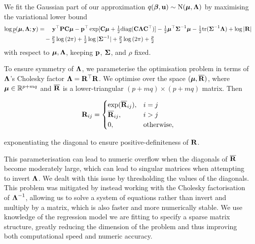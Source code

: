 \documentclass{amsart}[12pt]
\begin{document}
	We fit the Gaussian part of our approximation $q({\boldsymbol \beta}, {\bf u}) \sim \text{N}({\boldsymbol \mu}, {\boldsymbol \Lambda})$ by maximising 
	the variational lower bound	
	\begin{align*}
		\log \underline{p}({\boldsymbol \mu}, {\boldsymbol \Lambda}; {\bf y}) & = \quad {\bf y}^\top{\bf P} {\bf C} {\boldsymbol\mu} - {\bf p}^\top \exp[{\bf C} {\boldsymbol \mu} + \tfrac{1}{2} \text{diag}({\bf C} {\boldsymbol \Lambda} {\bf C}^\top)] - \tfrac{1}{2} {\boldsymbol \mu}^\top {\boldsymbol\Sigma}^{-1} {\boldsymbol \mu} - \tfrac{1}{2} \text{tr}{({\boldsymbol\Sigma}^{-1} {\boldsymbol\Lambda})} + \log{|{\bf R}|} \\
		                                        & \quad - \tfrac{p}{2} \log{(2 \pi)} + \tfrac{1}{2} \log{|{\boldsymbol\Sigma}^{-1}|} + \tfrac{p}{2} \log{(2 \pi)} + \tfrac{p}{2}                                                                              
	\end{align*}
	\noindent with respect to ${\boldsymbol \mu}, {\boldsymbol \Lambda}$, keeping ${\bf p}$, ${\boldsymbol \Sigma}$, and $\rho$ fixed.
		
	To ensure symmetry of ${\boldsymbol \Lambda}$, we parameterise the optimisation problem in terms of ${\boldsymbol \Lambda}$'s
	Cholesky factor  ${\boldsymbol \Lambda} = {\bf R}^\top {\bf R}$. We optimise over the space $({\boldsymbol \mu}, \overline{{\bf R}})$, where ${\boldsymbol \mu}
	\in {\mathbb{R}}^{p + mq}$ and $\overline{{\bf R}}$ is a lower-triangular $(p + mq) \times (p + mq)$ matrix. Then
		
	\begin{equation*}
		{\bf R}_{ij} =
		\begin{cases}
			\exp(\overline{{\bf R}}_{ij}), & i = j             \\
			\overline{{\bf R}}_{ij},       & i > j             \\
			0,                         & \text{otherwise}, 
		\end{cases}
	\end{equation*}
		
	\noindent exponentiating the diagonal to ensure positive-definiteness of ${\bf R}$.
		
	This parameterisation can lead to numeric overflow when the diagonals of $\overline{{\bf R}}$ become moderately
	large, which can lead to singular matrices when attempting to invert ${\boldsymbol \Lambda}$. We dealt with this issue by
	thresholding the values of the diagonals.  This problem was mitigated by  instead working with the Cholesky
	factorisation of ${\boldsymbol \Lambda}^{-1}$, allowing us to solve a system of equations rather than invert and multiply
	by a matrix, which is also faster and more numerically stable. We use knowledge of the regression  model we
	are fitting to specify a sparse matrix structure, greatly reducing the dimension of   the problem and thus
	improving both computational speed and numeric accuracy.
		
\end{document}
